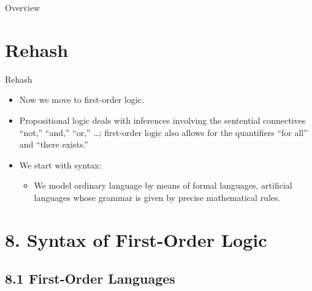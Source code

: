 \setcounter{framenumber}{224}
\begin{frame}
	\maketitle
\end{frame}

\begin{frame}{Overview}
\tableofcontents
\end{frame}

\section{Rehash}
\begin{frame}{Rehash}
	
\begin{itemize}

	\item Now we move to first-order logic.
	
	\item Propositional logic deals with inferences involving the sentential connectives ``not,'' ``and,'' ``or,'' \dots; \alert{first-order logic also allows for the quantifiers ``for all'' and ``there exists.''}

	\item We start with syntax:
	
		\begin{itemize}
		
			\item \alert{We model ordinary language by means of formal languages, artificial languages whose grammar is given by precise mathematical rules.}

		
		\end{itemize}
	
\end{itemize}

\end{frame}
		

\section{8. Syntax of First-Order Logic}
\subsection{8.1 First-Order Languages}

